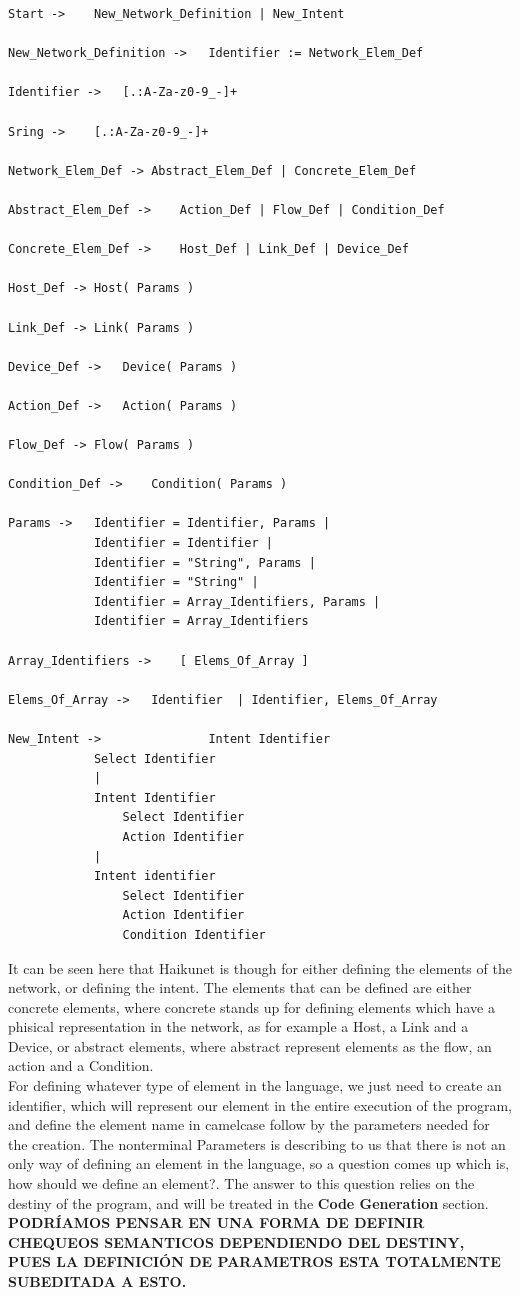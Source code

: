 \begin{lstlisting}[breaklines=true]
Start ->	New_Network_Definition | New_Intent

New_Network_Definition ->	Identifier := Network_Elem_Def

Identifier ->	[.:A-Za-z0-9_-]+

Sring ->	[.:A-Za-z0-9_-]+

Network_Elem_Def ->	Abstract_Elem_Def | Concrete_Elem_Def

Abstract_Elem_Def ->	Action_Def | Flow_Def | Condition_Def

Concrete_Elem_Def ->	Host_Def | Link_Def | Device_Def 

Host_Def ->	Host( Params )

Link_Def ->	Link( Params )

Device_Def ->	Device( Params )

Action_Def ->	Action( Params )

Flow_Def ->	Flow( Params )

Condition_Def ->	Condition( Params )

Params -> 	Identifier = Identifier, Params | 
			Identifier = Identifier |
			Identifier = "String", Params |
			Identifier = "String" |
			Identifier = Array_Identifiers, Params |
			Identifier = Array_Identifiers 

Array_Identifiers ->	[ Elems_Of_Array ] 

Elems_Of_Array ->	Identifier  | Identifier, Elems_Of_Array

New_Intent ->				Intent Identifier
			Select Identifier	
			|    
			Intent Identifier
				Select Identifier            	
				Action Identifier                    
			| 
			Intent identifier
				Select Identifier
				Action Identifier
				Condition Identifier
\end{lstlisting}

It can be seen here that Haikunet is though for either defining the elements of the network, or defining the intent. The elements that can be defined are either concrete elements, where concrete stands up for defining elements which have a phisical representation in the network, as for example a Host, a Link and a Device, or abstract elements, where abstract represent elements as the flow, an action and a Condition. \\
For defining whatever type of element in the language, we just need to create an identifier, which will represent our element in the entire execution of the program, and define the element name in camelcase follow by the parameters needed for the creation. The nonterminal Parameters is describing to us that there is not an only way of defining an element in the language, so a question comes up which is, how should we define an element?. The answer to this question relies on the destiny of the program, and will be treated in the \textbf{Code Generation} section. \textbf{PODRÍAMOS PENSAR EN UNA FORMA DE DEFINIR CHEQUEOS SEMANTICOS DEPENDIENDO DEL DESTINY, PUES LA DEFINICIÓN DE PARAMETROS ESTA TOTALMENTE SUBEDITADA A ESTO.}


